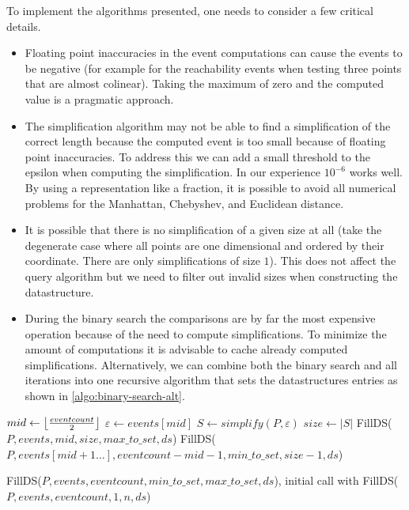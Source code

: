 To implement the algorithms presented, one needs to consider a few critical details. 
\begin{itemize}
	\item Floating point inaccuracies in the event computations can cause the events to be negative (for example for the reachability events when testing three points that are almost colinear). Taking the maximum of zero and the computed value is a pragmatic approach. 
	\item The simplification algorithm may not be able to find a simplification of the correct length because the computed event is too small because of floating point inaccuracies. To address this we can add a small threshold to the epsilon when computing the simplification. In our experience \(10^{-6}\) works well. By using a representation like a fraction, it is possible to avoid all numerical problems for the Manhattan, Chebyshev, and Euclidean distance.

	\item It is possible that there is no simplification of a given size at all (take the degenerate case where all points are one dimensional and ordered by their coordinate. There are only simplifications of size \(1\)). This does not affect the query algorithm but we need to filter out invalid sizes when constructing the datastructure.
	\item During the binary search the comparisons are by far the most expensive operation because of the need to compute simplifications. To minimize the amount of computations it is advisable to cache already computed simplifications. Alternatively, we can combine both the binary search and all iterations into one recursive algorithm that sets the datastructures entries as shown in \cref{algo:binary-search-alt}.
\end{itemize}

\begin{algorithm}[ht]
  \DontPrintSemicolon
  \BlankLine
	\(mid \gets \left\lfloor\frac{eventcount}{2}\right\rfloor\)\;
	\(\varepsilon \gets events[mid]\)\;
	\(S \gets simplify(P, \varepsilon)\) 
	\(size \gets |S|\)\;
	FillDS(\(P, events, mid, size, max\_to\_set, ds\))\;
	FillDS(\(P, events[mid + 1 \dots], eventcount - mid - 1, min\_to\_set, size - 1, ds\))\;
	\caption{FillDS(\(P, events, eventcount, min\_to\_set, max\_to\_set, ds\)), initial call with FillDS(\(P, events, eventcount, 1, n, ds\))}
	\label{algo:binary-search-alt}
\end{algorithm}

